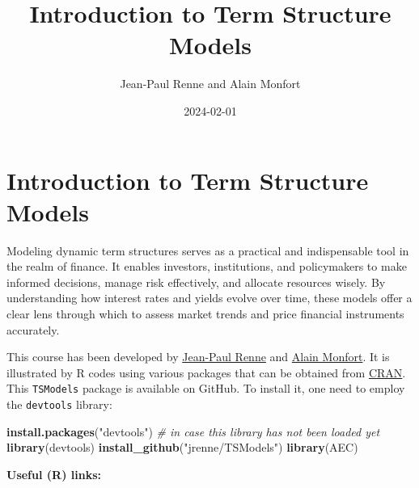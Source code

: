 \documentclass[
  12pt,
]{book}
\title{Introduction to Term Structure Models}
\author{Jean-Paul Renne and Alain Monfort}
\date{2024-02-01}
\newenvironment{Shaded}{\begin{snugshade}}{\end{snugshade}}
\newcommand{\CommentTok}[1]{\textcolor[rgb]{0.56,0.35,0.01}{\textit{#1}}}
\newcommand{\FunctionTok}[1]{\textcolor[rgb]{0.13,0.29,0.53}{\textbf{#1}}}
\newcommand{\NormalTok}[1]{#1}
\newcommand{\StringTok}[1]{\textcolor[rgb]{0.31,0.60,0.02}{#1}}
\theoremstyle{definition}
\theoremstyle{definition}
\theoremstyle{definition}
\theoremstyle{definition}
\theoremstyle{remark}
\begin{document}
\maketitle

{
\setcounter{tocdepth}{1}
\tableofcontents
}
\newcommand{\bv}[1]{\mathbf{#1}}

\hypertarget{intro}{%
\chapter*{Introduction to Term Structure Models}\label{intro}}

Modeling dynamic term structures serves as a practical and indispensable tool in the realm of finance. It enables investors, institutions, and policymakers to make informed decisions, manage risk effectively, and allocate resources wisely. By understanding how interest rates and yields evolve over time, these models offer a clear lens through which to assess market trends and price financial instruments accurately.

This course has been developed by \href{https://sites.google.com/site/jeanpaulrenne/home}{Jean-Paul Renne} and \href{https://faculty.crest.fr/amonfort/}{Alain Monfort}. It is illustrated by R codes using various packages that can be obtained from \href{https://cran.r-project.org}{CRAN}. This \texttt{TSModels} package is available on GitHub. To install it, one need to employ the \texttt{devtools} library:

\begin{Shaded}
\begin{Highlighting}[]
\FunctionTok{install.packages}\NormalTok{(}\StringTok{"devtools"}\NormalTok{) }\CommentTok{\# in case this library has not been loaded yet}
\FunctionTok{library}\NormalTok{(devtools)}
\FunctionTok{install\_github}\NormalTok{(}\StringTok{"jrenne/TSModels"}\NormalTok{)}
\FunctionTok{library}\NormalTok{(AEC)}
\end{Highlighting}
\end{Shaded}

\textbf{Useful (R) links:}
\end{document}
